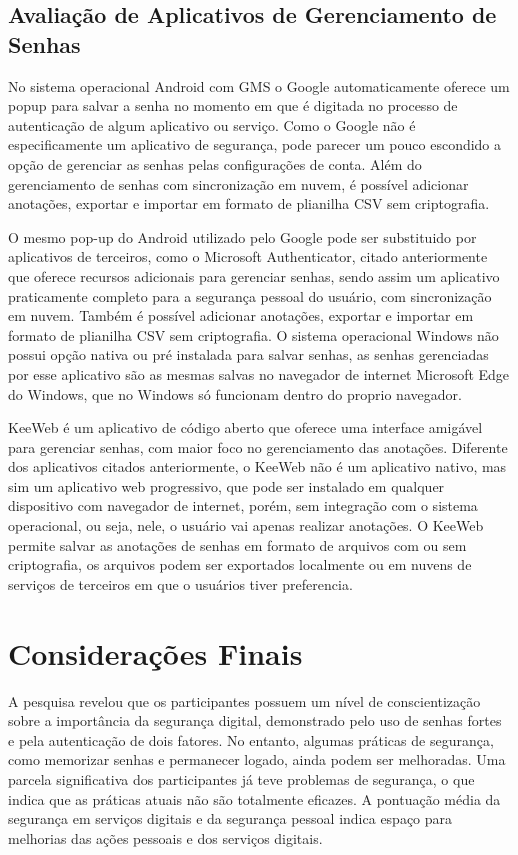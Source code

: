 \documentclass[12pt]{article}
\begin{document}
\subsection{Avaliação de Aplicativos de Gerenciamento de Senhas}

No sistema operacional Android com GMS o Google automaticamente oferece um popup
para salvar a senha no momento em que é digitada no processo de autenticação de
algum aplicativo ou serviço.
Como o Google não é especificamente um aplicativo de segurança, pode parecer um
pouco escondido a opção de gerenciar as senhas pelas configurações de conta.
Além do gerenciamento de senhas com sincronização em nuvem, é possível adicionar
anotações, exportar e importar em formato de plianilha CSV sem criptografia.

O mesmo pop-up do Android utilizado pelo Google pode ser substituido por
aplicativos de terceiros, como o Microsoft Authenticator, citado anteriormente
que oferece recursos adicionais para gerenciar senhas, sendo assim um aplicativo
praticamente completo para a segurança pessoal do usuário, com sincronização em
nuvem.
Também é possível adicionar anotações, exportar e importar em formato de
plianilha CSV sem criptografia.
O sistema operacional Windows não possui opção nativa ou pré instalada para
salvar senhas, as senhas gerenciadas por esse aplicativo são as mesmas salvas no
navegador de internet Microsoft Edge do Windows, que no Windows só funcionam
dentro do proprio navegador.

KeeWeb é um aplicativo de código aberto que oferece uma interface amigável para
gerenciar senhas, com maior foco no gerenciamento das anotações.
Diferente dos aplicativos citados anteriormente, o KeeWeb não é um aplicativo
nativo, mas sim um aplicativo web progressivo, que pode ser instalado em qualquer
dispositivo com navegador de internet, porém, sem integração com o sistema
operacional, ou seja, nele, o usuário vai apenas realizar anotações.
O KeeWeb permite salvar as anotações de senhas em formato de arquivos com ou sem
criptografia, os arquivos podem ser exportados localmente ou em nuvens de
serviços de terceiros em que o usuários tiver preferencia.

\section{Considerações Finais}

A pesquisa revelou que os participantes possuem um nível de conscientização sobre
a importância da segurança digital, demonstrado pelo uso de senhas fortes e pela
autenticação de dois fatores.
No entanto, algumas práticas de segurança, como memorizar senhas e permanecer
logado, ainda podem ser melhoradas.
Uma parcela significativa dos participantes já teve problemas de segurança, o que
indica que as práticas atuais não são totalmente eficazes.
A pontuação média da segurança em serviços digitais e da segurança pessoal indica
espaço para melhorias das ações pessoais e dos serviços digitais.
\end{document}
